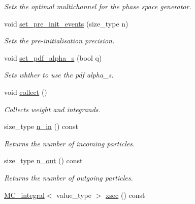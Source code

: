 \begin{DoxyCompactItemize}
\begin{DoxyCompactList}\small\item\em Sets the optimal multichannel for the phase space generator. \end{DoxyCompactList}\item 
\hypertarget{a00430_ae528aa2b51557bd056bc9fb4f7f0c45a}{void \hyperlink{a00430_ae528aa2b51557bd056bc9fb4f7f0c45a}{set\-\_\-pre\-\_\-init\-\_\-events} (size\-\_\-type n)}\label{a00430_ae528aa2b51557bd056bc9fb4f7f0c45a}

\begin{DoxyCompactList}\small\item\em Sets the pre-\/initialisation precision. \end{DoxyCompactList}\item 
\hypertarget{a00430_a3aabcbc95ce33eb7470d0835fb819e9d}{void \hyperlink{a00430_a3aabcbc95ce33eb7470d0835fb819e9d}{set\-\_\-pdf\-\_\-alpha\-\_\-s} (bool q)}\label{a00430_a3aabcbc95ce33eb7470d0835fb819e9d}

\begin{DoxyCompactList}\small\item\em Sets whther to use the pdf alpha\-\_\-s. \end{DoxyCompactList}\item 
\hypertarget{a00430_aec5ea6224c468400b25db59f91fe18f6}{void \hyperlink{a00430_aec5ea6224c468400b25db59f91fe18f6}{collect} ()}\label{a00430_aec5ea6224c468400b25db59f91fe18f6}

\begin{DoxyCompactList}\small\item\em Collects weight and integrands. \end{DoxyCompactList}\item 
\hypertarget{a00430_ae6df2a426c0cf72984ab3f7efd799aad}{size\-\_\-type \hyperlink{a00430_ae6df2a426c0cf72984ab3f7efd799aad}{n\-\_\-in} () const }\label{a00430_ae6df2a426c0cf72984ab3f7efd799aad}

\begin{DoxyCompactList}\small\item\em Returns the number of incoming particles. \end{DoxyCompactList}\item 
\hypertarget{a00430_a96a001cf583b9e4d3078dab87e98bfa4}{size\-\_\-type \hyperlink{a00430_a96a001cf583b9e4d3078dab87e98bfa4}{n\-\_\-out} () const }\label{a00430_a96a001cf583b9e4d3078dab87e98bfa4}

\begin{DoxyCompactList}\small\item\em Returns the number of outgoing particles. \end{DoxyCompactList}\item 
\hypertarget{a00430_ae03964c8381d615c25a1528ad4a37387}{\hyperlink{a00363}{M\-C\-\_\-integral}$<$ value\-\_\-type $>$ \hyperlink{a00430_ae03964c8381d615c25a1528ad4a37387}{xsec} () const }\label{a00430_ae03964c8381d615c25a1528ad4a37387}


\end{DoxyCompactItemize}
